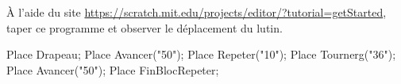 \begin{exercice}
    À l'aide du site 
   \href{Scratch3}{https://scratch.mit.edu/projects/editor/?tutorial=getStarted}, taper ce programme et
   observer le déplacement du lutin.

    \begin{Scratch}
        Place Drapeau;
        Place Avancer("50");
        Place Repeter("10");
        Place Tournerg("36");
        Place Avancer("50");
        Place FinBlocRepeter;
    \end{Scratch}
\end{exercice}